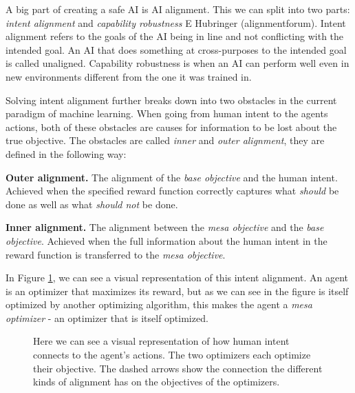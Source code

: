 \documentclass[12pt,A4]{report}
\newcommand{\autobaj}{}
\theoremstyle{definition}
\begin{document}

A big part of creating a safe AI is AI alignment. This we can split into two parts: \textit{intent alignment} and \textit{capability robustness} \autobaj{E Hubringer (alignmentforum)}. Intent alignment refers to the goals of the AI being in line and not conflicting with the intended goal. An AI that does something at cross-purposes to the intended goal is called unaligned. Capability robustness is when an AI can perform well even in new environments different from the one it was trained in. 

Solving intent alignment further breaks down into two obstacles in the current paradigm of machine learning. When going from human intent to the agents actions, both of these obstacles are causes for information to be lost about the true objective. The obstacles are called \textit{inner} and \textit{outer alignment}, they are defined in the following way:

\begin{displayquote} 
\textbf{Outer alignment.} 
The alignment of the \textit{base objective} and the human intent. Achieved when the specified reward function correctly captures what \textit{should} be done as well as what \textit{should not} be done.
\end{displayquote} 

\begin{displayquote} 
  \textbf{Inner alignment.} 
The alignment between the \textit{mesa objective} and the \textit{base objective}. Achieved when the full information about the human intent in the reward function is transferred to the \textit{mesa objective}.
\end{displayquote} 

In Figure \ref{fig:alignment}, we can see a visual representation of this intent alignment. An agent is an optimizer that maximizes its reward, but as we can see in the figure is itself optimized by another optimizing algorithm, this makes the agent a \textit{mesa optimizer} - an optimizer that is itself optimized. 



\begin{figure}[H]
  
  \caption{Here we can see a visual representation of how human intent connects to the agent's actions. The two optimizers each optimize their objective. The dashed arrows show the connection the different kinds of alignment has on the objectives of the optimizers.}
  \label{fig:alignment}
\end{figure}
\end{document}
